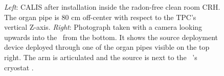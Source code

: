 \begin{figure}[htbp]
 \centering
{}
\caption{\textit{Left}: CALIS after installation inside the radon-free clean room CRH. The organ pipe is 80 cm off-center with respect to the TPC's vertical Z-axis. \textit{Right}: Photograph taken with a camera looking upwards into the \lsv\ from the bottom. It shows the source deployment device deployed through one of the organ pipes visible on the top right. The arm is articulated and the source is next to the \lar\ \tpc's cryostat \cite{Agnes:2015qyz}.
\label{fig:CALIS_photos}}
\end{figure}






